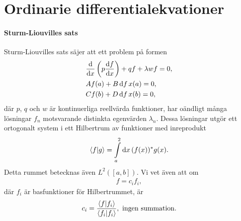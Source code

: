 \section{Ordinarie differentialekvationer}

\paragraph{Sturm-Liouvilles sats}
Sturm-Liouvilles sats säjer att ett problem på formen
\begin{align*}
	&\dv{x}\left(p\dv{f}{x}\right) + qf + \lambda wf = 0, \\
	&Af(a) + B\deval{f}{x}{a} = 0, \\
	&Cf(b) + D\deval{f}{x}{b} = 0,
\end{align*}
där $p$, $q$ och $w$ är kontinuerliga reellvärda funktioner, har oändligt många lösningar $f_{n}$ motsvarande distinkta egenvärden $\lambda_{n}$. Dessa lösningar utgör ett ortogonalt system i ett Hilbertrum av funktioner med inreprodukt
\begin{align*}
	\inprod{f}{g} = \inteval{a}{b}{x}{\cc{(f(x))}g(x)}.
\end{align*}
Detta rummet betecknas även $L^{2}([a, b])$. Vi vet även att om
\begin{align*}
	f = c_{i}f_{i},
\end{align*}
där $f_{i}$ är basfunktioner för Hilbertrummet, är
\begin{align*}
	c_{i} = \frac{\inprod{f}{f_{i}}}{\inprod{f_{i}}{f_{i}}}, \text{ ingen summation.}
\end{align*}